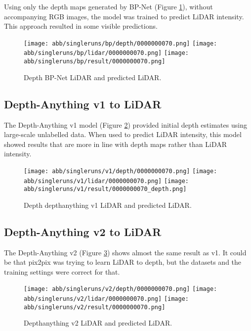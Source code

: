 Using only the depth maps generated by BP-Net (Figure \ref{bp_results}), without accompanying RGB images, the model was trained to predict LiDAR intensity. This approach resulted in some visible predictions.
\begin{figure}[!ht]
	\centering
	\texttt{[image: abb/singleruns/bp/depth/0000000070.png]}
	\texttt{[image: abb/singleruns/bp/lidar/0000000070.png]}
	\texttt{[image: abb/singleruns/bp/result/0000000070.png]}
	\caption{Depth BP-Net LiDAR and predicted LiDAR.}
	\label{bp_results}
\end{figure}
\newpage
\subsection{Depth-Anything v1 to LiDAR}

The Depth-Anything v1 model (Figure \ref{v1_results}) provided initial depth estimates using large-scale unlabelled data. When used to predict LiDAR intensity, this model showed results that are more in line with depth maps rather than LiDAR intensity.
\begin{figure}[!ht]
	\centering
	\texttt{[image: abb/singleruns/v1/depth/0000000070.png]}
	\texttt{[image: abb/singleruns/v1/lidar/0000000070.png]}
	\texttt{[image: abb/singleruns/v1/result/0000000070\_depth.png]}
	\caption{Depth depthanything v1 LiDAR and predicted LiDAR.}
	\label{v1_results}
\end{figure}
\newpage
\subsection{Depth-Anything v2 to LiDAR}

The Depth-Anything v2 (Figure \ref{v2_results}) shows almost the same result as v1. It could be that pix2pix was trying to learn LiDAR to depth, but the datasets and the training settings were correct for that.
\begin{figure}[!ht]
	\centering
	\texttt{[image: abb/singleruns/v2/depth/0000000070.png]}
	\texttt{[image: abb/singleruns/v2/lidar/0000000070.png]}
	\texttt{[image: abb/singleruns/v2/result/0000000070.png]}
	\caption{Depthanything v2 LiDAR and predicted LiDAR.}
	\label{v2_results}
\end{figure}
\newpage
